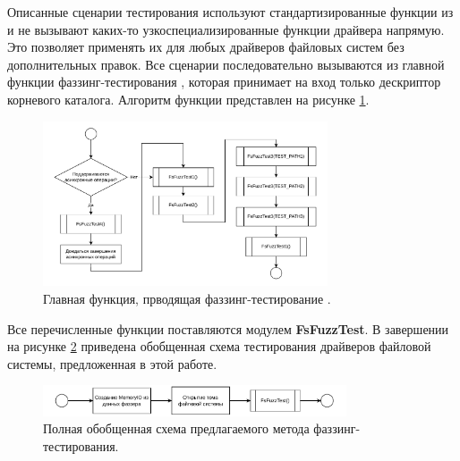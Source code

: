 Описанные сценарии тестирования используют стандартизированные функции из  и не вызывают каких-то узкоспециализированные функции драйвера напрямую. Это позволяет применять их для любых драйверов файловых систем без дополнительных правок. Все сценарии последовательно вызываются из главной функции фаззинг-тестирования , которая принимает на вход только дескриптор корневого каталога. Алгоритм функции представлен на рисунке \ref{met:pic:fsfuzztest}.
\begin{figure}[htbp]
	\centering %
	\includegraphics[width=0.75\textwidth]{FsFuzzTest.pdf} %
	\caption{Главная функция, прводящая фаззинг-тестирование .} %
	\label{met:pic:fsfuzztest} %
\end{figure} 

Все перечисленные функции поставляются модулем \textbf{FsFuzzTest}. В завершении на рисунке \ref{met:pic:testscheme} приведена обобщенная схема тестирования драйверов файловой системы, предложенная в этой работе.
\begin{figure}[htbp]
	\centering %
	\includegraphics[width=0.8\textwidth]{TestScheme.pdf} %
	\caption{Полная обобщенная схема предлагаемого метода фаззинг-тестирования.} %
	\label{met:pic:testscheme} %
\end{figure} 